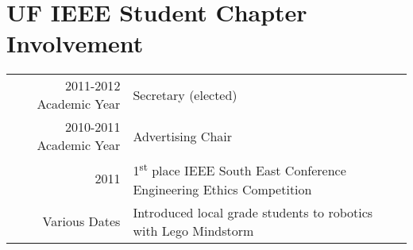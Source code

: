 \documentclass[a4paper,10pt]{article} %
\begin{document}
\section{UF IEEE Student Chapter Involvement}

\begin{tabular}{rl}
2011-2012 Academic Year &  Secretary (elected) \\

2010-2011 Academic Year & Advertising Chair \\

2011 & 1\textsuperscript{st} place IEEE South East Conference Engineering Ethics Competition\\

Various Dates & Introduced local grade students to robotics with Lego Mindstorm\\
\end{tabular}


\end{document}
